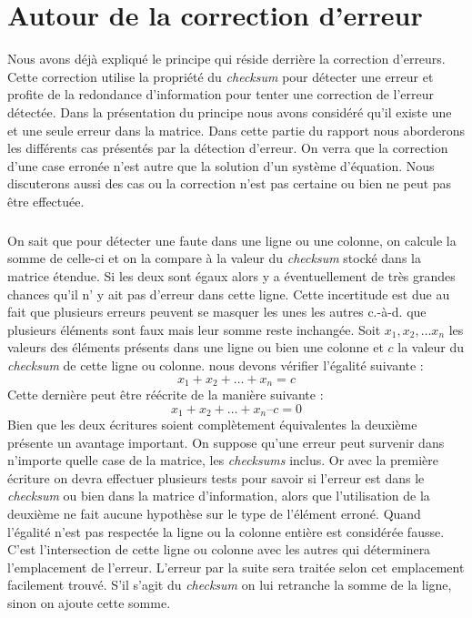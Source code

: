 \documentclass[a4paper, 10pt]{report}
\begin{document}
\chapter{Autour de la correction d'erreur}
Nous avons déjà expliqué le principe qui réside derrière la correction d’erreurs. Cette correction utilise la propriété 
du \textit{checksum} pour détecter une erreur et profite de la redondance d’information pour tenter une correction de 
l’erreur détectée. Dans la présentation du principe nous avons considéré qu’il existe une et une seule erreur dans la matrice. 
Dans cette partie du rapport nous aborderons les différents cas présentés par la détection d’erreur. On verra que la 
correction d’une case erronée n’est autre que la solution d’un système d’équation. Nous discuterons aussi des cas ou 
la correction n’est pas certaine ou bien ne peut pas être effectuée.
\paragraph*{}
On sait que pour détecter une faute dans une ligne ou une colonne,  on calcule la somme de celle-ci et on la compare à la 
valeur du \textit{checksum} stocké dans la matrice étendue. Si les deux sont égaux alors y a éventuellement de très grandes 
chances qu’il n’ y ait pas d’erreur dans cette ligne. Cette incertitude est due au fait que plusieurs erreurs peuvent se masquer 
les unes les autres c.-à-d. que plusieurs éléments sont faux mais leur somme reste inchangée. Soit $x_1, x_2,\ldots x_n$ 
les valeurs des éléments présents dans une ligne ou bien une colonne et $c$ la valeur du \textit{checksum} de cette ligne 
ou colonne. nous devons vérifier l’égalité suivante : \[x_1 + x_2 + \ldots + x_n = c\]
Cette dernière peut être réécrite de la manière suivante : \[x_1 + x_2 + \ldots + x_n – c = 0\]
Bien que les deux écritures soient complètement équivalentes la deuxième présente un avantage important. On suppose 
qu’une erreur peut survenir dans n’importe quelle case de la matrice, les \textit{checksums} inclus. Or avec la 
première écriture on devra effectuer plusieurs tests pour savoir si l’erreur est dans le \textit{checksum} ou bien dans 
la matrice d’information, alors que l’utilisation de la deuxième ne fait aucune hypothèse sur le type de l’élément erroné. 
Quand l’égalité n’est pas respectée la ligne ou la colonne entière est considérée fausse. C’est l’intersection de cette 
ligne ou colonne avec les autres qui déterminera l’emplacement de l’erreur. L’erreur par la suite sera traitée selon cet 
emplacement facilement trouvé. S’il s’agit du \textit{checksum} on lui retranche la somme de la ligne, sinon on ajoute cette somme.
\end{document}
